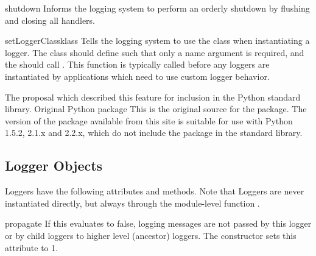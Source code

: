 \begin{funcdesc}{shutdown}{}
Informs the logging system to perform an orderly shutdown by flushing and
closing all handlers.
\end{funcdesc}

\begin{funcdesc}{setLoggerClass}{klass}
Tells the logging system to use the class  when instantiating a
logger. The class should define  such that only a name
argument is required, and the  should call
. This function is typically called before any
loggers are instantiated by applications which need to use custom logger
behavior.
\end{funcdesc}


\begin{seealso}
         {The proposal which described this feature for inclusion in
          the Python standard library.}
          {Original Python  package}
          {This is the original source for the 
           package.  The version of the package available from this
           site is suitable for use with Python 1.5.2, 2.1.x and 2.2.x,
           which do not include the  package in the standard
           library.}
\end{seealso}


\subsection{Logger Objects}

Loggers have the following attributes and methods. Note that Loggers are
never instantiated directly, but always through the module-level function
.

\begin{datadesc}{propagate}
If this evaluates to false, logging messages are not passed by this
logger or by child loggers to higher level (ancestor) loggers. The
constructor sets this attribute to 1.
\end{datadesc}

